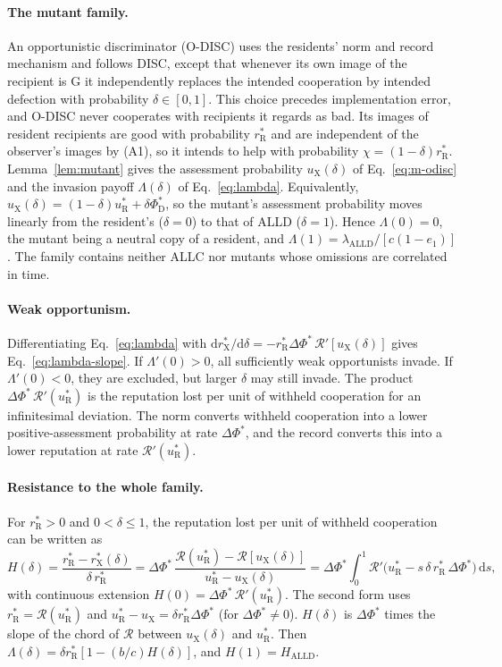 \documentclass[fleqn,10pt]{wlscirep}
\newcommand{\Rmap}{\mathscr{R}}            %
\newcommand{\rR}{r_{\mathrm{R}}^{*}}
\newcommand{\uR}{u_{\mathrm{R}}^{*}}
\newcommand{\rX}{r_{\mathrm{X}}^{*}}
\newcommand{\uX}{u_{\mathrm{X}}}
\newcommand{\dPhi}{\Delta\Phi^{*}}
\newcommand{\dd}{\mathrm{d}}
\newcommand{\ALLD}{\mathrm{ALLD}}
\theoremstyle{plain}
\begin{document}
\paragraph{The mutant family.} An opportunistic discriminator (O-DISC) uses the residents' norm and record mechanism and follows DISC, except that whenever its own image of the recipient is G it independently replaces the intended cooperation by intended defection with probability $\delta\in[0,1]$. This choice precedes implementation error, and O-DISC never cooperates with recipients it regards as bad. Its images of resident recipients are good with probability $\rR$ and are independent of the observer's images by (A1), so it intends to help with probability $\chi=(1-\delta)\rR$. Lemma~\ref{lem:mutant} gives the assessment probability $\uX(\delta)$ of Eq.~\eqref{eq:m-odisc} and the invasion payoff $\Lambda(\delta)$ of Eq.~\eqref{eq:lambda}. Equivalently, $\uX(\delta)=(1-\delta)\uR+\delta\Phi^*_{\mathrm D}$, so the mutant's assessment probability moves linearly from the resident's ($\delta=0$) to that of ALLD ($\delta=1$). Hence $\Lambda(0)=0$, the mutant being a neutral copy of a resident, and $\Lambda(1)=\lambda_{\ALLD}/[c(1-e_1)]$. The family contains neither ALLC nor mutants whose omissions are correlated in time.

\paragraph{Weak opportunism.} Differentiating Eq.~\eqref{eq:lambda} with $\dd\rX/\dd\delta=-\rR\dPhi\,\Rmap'[\uX(\delta)]$ gives Eq.~\eqref{eq:lambda-slope}. If $\Lambda'(0)>0$, all sufficiently weak opportunists invade. If $\Lambda'(0)<0$, they are excluded, but larger $\delta$ may still invade. The product $\dPhi\,\Rmap'(\uR)$ is the reputation lost per unit of withheld cooperation for an infinitesimal deviation. The norm converts withheld cooperation into a lower positive-assessment probability at rate $\dPhi$, and the record converts this into a lower reputation at rate $\Rmap'(\uR)$.

\paragraph{Resistance to the whole family.} For $\rR>0$ and $0<\delta\leq1$, the reputation lost per unit of withheld cooperation can be written as
\begin{equation}
H(\delta)=\frac{\rR-\rX(\delta)}{\delta\,\rR}=\dPhi\,\frac{\Rmap(\uR)-\Rmap[\uX(\delta)]}{\uR-\uX(\delta)}=\dPhi\int_0^1\Rmap'\bigl(\uR-s\,\delta\,\rR\,\dPhi\bigr)\,\dd s,
\label{eq:s-H}
\end{equation}
with continuous extension $H(0)=\dPhi\,\Rmap'(\uR)$. The second form uses $\rR=\Rmap(\uR)$ and $\uR-\uX=\delta\rR\dPhi$ (for $\dPhi\neq0$). $H(\delta)$ is $\dPhi$ times the slope of the chord of $\Rmap$ between $\uX(\delta)$ and $\uR$. Then $\Lambda(\delta)=\delta\rR[1-(b/c)H(\delta)]$, and $H(1)=H_{\ALLD}$.
\end{document}
